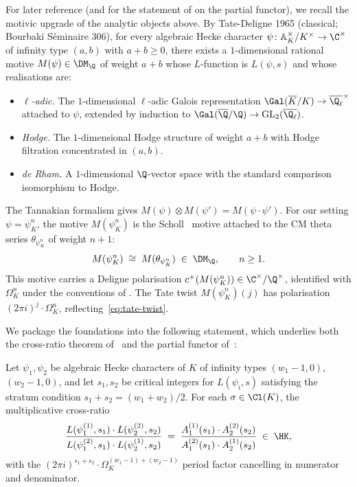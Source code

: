For later reference (and for the statement of 
on the partial functor), we recall the motivic upgrade of the
analytic objects above. By Tate-Deligne 1965 (classical;
Bourbaki S\'eminaire 306), for every algebraic Hecke character
$\psi \colon \mathbb{A}_K^\times/K^\times \to \C^\times$ of
infinity type $(a, b)$ with $a + b \geq 0$, there exists a
$1$-dimensional rational motive $M(\psi) \in \DM_\Q$ of weight
$a + b$ whose $L$-function is $L(\psi, s)$ and whose realisations
are:
\begin{itemize}
\item \emph{$\ell$-adic.} The $1$-dimensional $\ell$-adic Galois
representation $\Gal(\overline{K}/K) \to \overline{\Q_\ell}^\times$
attached to $\psi$, extended by induction to
$\Gal(\overline{\Q}/\Q) \to \mathrm{GL}_2(\overline{\Q_\ell})$.
\item \emph{Hodge.} The $1$-dimensional Hodge structure of weight
$a + b$ with Hodge filtration concentrated in $(a, b)$.
\item \emph{de Rham.} A $1$-dimensional $\Q$-vector space with
the standard comparison isomorphism to Hodge.
\end{itemize}
The Tannakian formalism gives $M(\psi) \otimes M(\psi') = M(\psi
\cdot \psi')$. For our setting $\psi = \psi_K^n$, the motive
$M(\psi_K^n)$ is the Scholl~\cite{Scholl1990} motive attached
to the CM theta series $\theta_{\psi_K^n}$ of weight $n + 1$:
\begin{equation}\label{eq:scholl-CM}
M(\psi_K^n) \;\cong\; M(\theta_{\psi_K^n}) \;\in\; \DM_\Q,
\qquad n \geq 1.
\end{equation}
This motive carries a Deligne polarisation $c^+(M(\psi_K^n))
\in \C^\times / \Q^\times$, identified with $\Omega_K^n$ under
the conventions of . The Tate twist
$M(\psi_K^n)(j)$ has polarisation $(2\pi i)^j \cdot \Omega_K^n$,
reflecting~\eqref{eq:tate-twist}.

We package the foundations into the following statement, which
underlies both the cross-ratio theorem of~ and
the partial functor of~:

\begin{proposition}
\label{prop:period-clean}
Let $\psi_1, \psi_2$ be algebraic Hecke characters of $K$ of
infinity types $(w_1 - 1, 0)$, $(w_2 - 1, 0)$, and let
$s_1, s_2$ be critical integers for $L(\psi_i, s)$ satisfying
the stratum condition $s_1 + s_2 = (w_1 + w_2)/2$. For each
$\sigma \in \Cl(K)$, the multiplicative cross-ratio
\[
\frac{L(\psi_1^{(1)}, s_1) \cdot L(\psi_2^{(2)}, s_2)}
     {L(\psi_1^{(2)}, s_1) \cdot L(\psi_2^{(1)}, s_2)}
\;=\;
\frac{A_1^{(1)}(s_1) \cdot A_2^{(2)}(s_2)}
     {A_1^{(2)}(s_1) \cdot A_2^{(1)}(s_2)}
\;\in\;\HK,
\]
with the $(2\pi i)^{s_1 + s_2} \cdot \Omega_K^{(w_1 - 1) + (w_2 - 1)}$
period factor cancelling in numerator and denominator.
\end{proposition}

